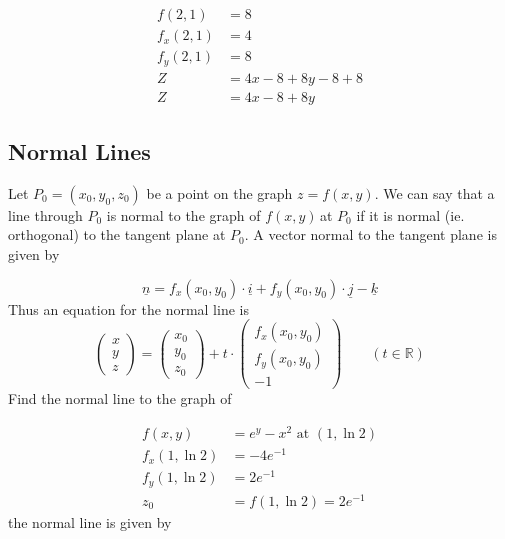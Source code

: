 \documentclass{article}
\newcommand{\n}{\leavevmode \newline} %
\newcommand{\R}{\mathbb{R}} %
\newcommand{\fxy}{$f(x,y)\,$} %
\numberwithin{equation}{subsection} %
\begin{document}
\begin{equation}
    \begin{split}
        f(2,1)&=8\\
        f_x(2,1)&=4\\
        f_y(2,1)&=8\\
        Z&=4x-8+8y-8+8\\
        Z&=4x-8+8y
    \end{split}
\end{equation}

\subsection{Normal Lines}
Let $P_0=(x_0,y_0,z_0)$ be a point on the graph $z=f(x,y)$. We can say that a line through $P_0$ is normal to the graph of \fxy at $P_0$ if it is normal (ie. orthogonal) to the tangent plane at $P_0$. A vector normal to the tangent plane is given by

\begin{equation}
    \underline{n}=f_x(x_0,y_0)\cdot\underline{i}+f_y(x_0,y_0)\cdot\underline{j}-\underline{k}
\end{equation}
\n
Thus an equation for the normal line is
\begin{equation}
    \begin{pmatrix}
    x\\y\\z
    \end{pmatrix}
    =
    \begin{pmatrix}
    x_0\\y_0\\z_0
    \end{pmatrix}
    + t\cdot
    \begin{pmatrix}
    f_x(x_0,y_0)\\
    f_y(x_0,y_0)\\
    -1
    \end{pmatrix}
    \qquad (t\in\R)
\end{equation}
\n
Find the normal line to the graph of

\begin{equation}
    \begin{split}
        f(x,y)&=e^y-x^2 \text{ at } (1,\ln2)\\
        f_x(1,\ln2)&=-4e^{-1}\\
        f_y(1,\ln2)&=2e^{-1}\\
        z_0&=f(1,\ln2)=2e^{-1}
    \end{split}
\end{equation}
\n
the normal line is given by
\end{document}
